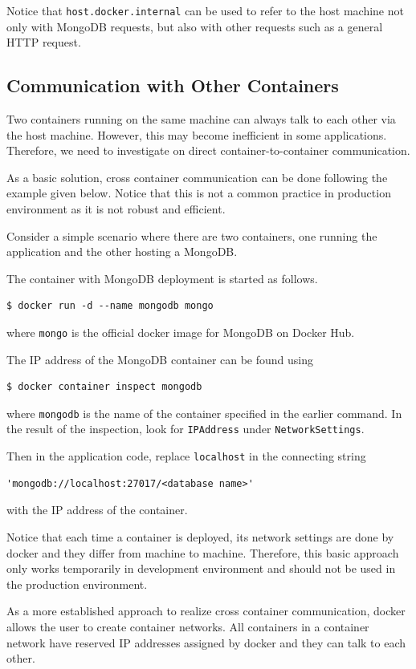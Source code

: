 Notice that \verb|host.docker.internal| can be used to refer to the host machine not only with MongoDB requests, but also with other requests such as a general HTTP request.

\subsection{Communication with Other Containers}

Two containers running on the same machine can always talk to each other via the host machine. However, this may become inefficient in some applications. Therefore, we need to investigate on direct container-to-container communication.

As a basic solution, cross container communication can be done following the example given below. Notice that this is not a common practice in production environment as it is not robust and efficient.

Consider a simple scenario where there are two containers, one running the application and the other hosting a MongoDB. 

The container with MongoDB deployment is started as follows.
\begin{lstlisting}
$ docker run -d --name mongodb mongo 	
\end{lstlisting}
where \verb|mongo| is the official docker image for MongoDB on Docker Hub.

The IP address of the MongoDB container can be found using
\begin{lstlisting}
$ docker container inspect mongodb	
\end{lstlisting}
where \verb|mongodb| is the name of the container specified in the earlier command. In the result of the inspection, look for \verb|IPAddress| under \verb|NetworkSettings|.

Then in the application code, replace \verb|localhost| in the connecting string
\begin{lstlisting}
'mongodb://localhost:27017/<database name>'	
\end{lstlisting}
with the IP address of the container.

Notice that each time a container is deployed, its network settings are done by docker and they differ from machine to machine. Therefore, this basic approach only works temporarily in development environment and should not be used in the production environment.

As a more established approach to realize cross container communication, docker allows the user to create container networks. All containers in a container network have reserved IP addresses assigned by docker and they can talk to each other.


